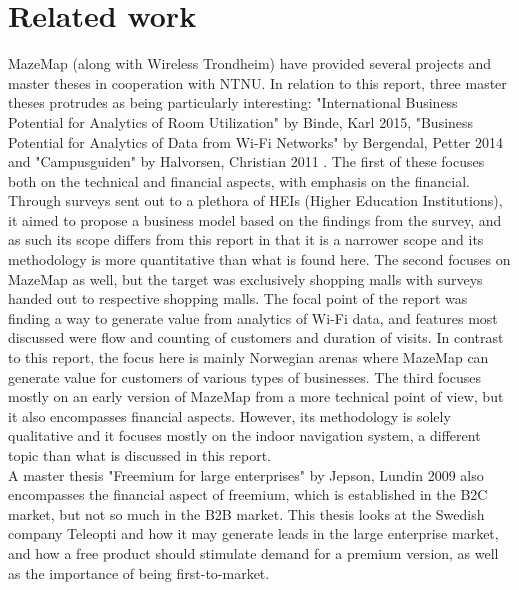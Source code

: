 \section {Related work}
MazeMap (along with Wireless Trondheim) have provided several projects and master theses in cooperation with NTNU. In relation to this report, three master theses protrudes as being particularly interesting: "International Business Potential for Analytics of Room Utilization" by Binde, Karl 2015, "Business Potential for Analytics of Data from Wi-Fi Networks" by Bergendal, Petter 2014 and "Campusguiden" by Halvorsen, Christian 2011 \cite{petterbergendal2014}\cite{karlbernhoffbinde2015}\cite{christianhalvorsen2011}. The first of these focuses both on the technical and financial aspects, with emphasis on the financial. Through surveys sent out to a plethora of HEIs (Higher Education Institutions), it aimed to propose a business model based on the findings from the survey, and as such its scope differs from this report in that it is a narrower scope and its methodology is more quantitative than what is found here. The second focuses on MazeMap as well, but the target was exclusively shopping malls with surveys handed out to respective shopping malls. The focal point of the report was finding a way to generate value from analytics of Wi-Fi data, and features most discussed were flow and counting of customers and duration of visits. In contrast to this report, the focus here is mainly Norwegian arenas where MazeMap can generate value for customers of various types of businesses. The third focuses mostly on an early version of MazeMap from a more technical point of view, but it also encompasses financial aspects. However, its methodology is solely qualitative and it focuses mostly on the indoor navigation system, a different topic than what is discussed in this report. 
\newline
\\
A master thesis "Freemium for large enterprises" by Jepson, Lundin 2009 \cite{annajepsonelinlundin2009} also encompasses the financial aspect of freemium, which is established in the B2C market, but not so much in the B2B market. This thesis looks at the Swedish company Teleopti and how it may generate leads in the large enterprise market, and how a free product should stimulate demand for a premium version, as well as the importance of being first-to-market.
